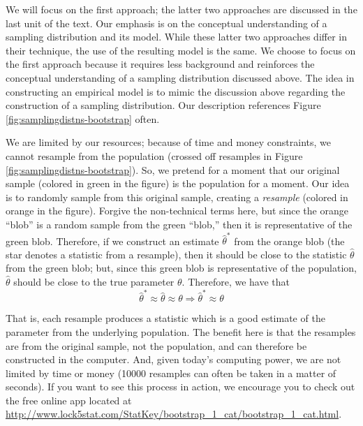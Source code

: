 \documentclass[]{book}
\theoremstyle{plain}
\theoremstyle{mydefn}
\theoremstyle{myexmpl}
\theoremstyle{remark}
\begin{document}
We will focus on the first approach; the latter two approaches are
discussed in the last unit of the text. Our emphasis is on the
conceptual understanding of a sampling distribution and its model. While
these latter two approaches differ in their technique, the use of the
resulting model is the same. We choose to focus on the first approach
because it requires less background and reinforces the conceptual
understanding of a sampling distribution discussed above. The idea in
constructing an empirical model is to mimic the discussion above
regarding the construction of a sampling distribution. Our description
references Figure \ref{fig:samplingdistns-bootstrap} often.

We are limited by our resources; because of time and money constraints,
we cannot resample from the population (crossed off resamples in Figure
\ref{fig:samplingdistns-bootstrap}). So, we pretend for a moment that
our original sample (colored in green in the figure) is the population
for a moment. Our idea is to randomly sample from this original sample,
creating a \emph{resample} (colored in orange in the figure). Forgive
the non-technical terms here, but since the orange ``blob'' is a random
sample from the green ``blob,'' then it is representative of the green
blob. Therefore, if we construct an estimate \(\widehat{\theta}^*\) from
the orange blob (the star denotes a statistic from a resample), then it
should be close to the statistic \(\widehat{\theta}\) from the green
blob; but, since this green blob is representative of the population,
\(\widehat{\theta}\) should be close to the true parameter \(\theta\).
Therefore, we have that \[
\widehat{\theta}^* \approx \widehat{\theta} \approx \theta \Rightarrow \widehat{\theta}^* \approx \theta
\]

That is, each resample produces a statistic which is a good estimate of
the parameter from the underlying population. The benefit here is that
the resamples are from the original sample, not the population, and can
therefore be constructed in the computer. And, given today's computing
power, we are not limited by time or money (10000 resamples can often be
taken in a matter of seconds). If you want to see this process in
action, we encourage you to check out the free online app located at
\url{http://www.lock5stat.com/StatKey/bootstrap_1_cat/bootstrap_1_cat.html}.
\end{document}
